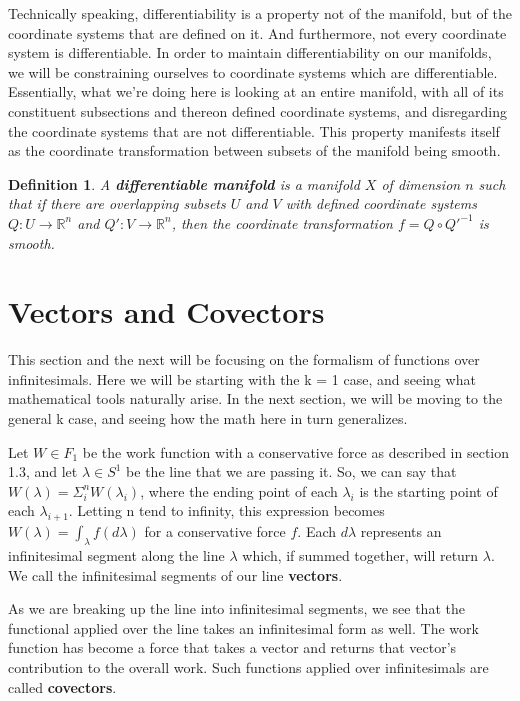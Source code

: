 \documentclass{book}
\newtheorem{defn}[equation]{Definition}
\begin{document}
Technically speaking, differentiability is a property not of the manifold, but of the coordinate systems that are defined on it. And furthermore, not every coordinate system is differentiable. In order to maintain differentiability on our manifolds, we will be constraining ourselves to coordinate systems which are differentiable. Essentially, what we're doing here is looking at an entire manifold, with all of its constituent subsections and thereon defined coordinate systems, and disregarding the coordinate systems that are not differentiable. This property manifests itself as the coordinate transformation between subsets of the manifold being smooth. 


\begin{defn}
	A \textbf{differentiable manifold} is a manifold $X$ of dimension $n$ such that if there are overlapping subsets $U$ and $V$ with defined coordinate systems $Q: U \to \mathbb{R}^n$ and $Q': V \to \mathbb{R}^n$, then the coordinate transformation $f = Q \circ Q'^{-1}$ is smooth. 
\end{defn}





\section{Vectors and Covectors}


This section and the next will be focusing on the formalism of functions over infinitesimals. Here we will be starting with the k = 1 case, and seeing what mathematical tools naturally arise. In the next section, we will be moving to the general k case, and seeing how the math here in turn generalizes. 


Let $W \in F_1$ be the work function with a conservative force as described in section 1.3, and let $\lambda \in S^1$ be the line that we are passing it. So, we can say that $W(\lambda) = \Sigma^n_iW(\lambda_i)$, where the ending point of each $\lambda_i$ is the starting point of each $\lambda_{i+1}$. Letting n tend to infinity, this expression becomes $W(\lambda) = \int_{\lambda} f(d\lambda)$ for a conservative force $f$. Each $d\lambda$ represents an infinitesimal segment along the line $\lambda$ which, if summed together, will return $\lambda$. We call the infinitesimal segments of our line \textbf{vectors}. 

As we are breaking up the line into infinitesimal segments, we see that the functional applied over the line takes an infinitesimal form as well. The work function has become a force that takes a vector and returns that vector's contribution to the overall work. Such functions applied over infinitesimals are called \textbf{covectors}. 
\end{document}
